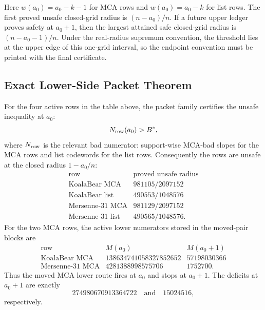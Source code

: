 Here \(w(a_0)=a_0-k-1\) for MCA rows and \(w(a_0)=a_0-k\) for list rows.
The first proved unsafe closed-grid radius is \((n-a_0)/n\).  If a future
upper ledger proves safety at \(a_0+1\), then the largest attained safe
closed-grid radius is \((n-a_0-1)/n\).  Under the real-radius supremum
convention, the threshold lies at the upper edge of this one-grid interval,
so the endpoint convention must be printed with the final certificate.

\subsection{Exact Lower-Side Packet Theorem}

\begin{proposition}
\label{prop:finite-packet-unsafe}
For the four active rows in the table above, the packet family certifies the
unsafe inequality at \(a_0\):
\[
        N_{\rm row}(a_0)>B^*,
\]
where \(N_{\rm row}\) is the relevant bad numerator: support-wise MCA-bad
slopes for the MCA rows and list codewords for the list rows.  Consequently
the rows are unsafe at the closed radius \(1-a_0/n\):
\[
\begin{array}{c|c}
\text{row} & \text{proved unsafe radius}\\ \hline
\text{KoalaBear MCA} & 981105/2097152\\
\text{KoalaBear list} & 490553/1048576\\
\text{Mersenne-31 MCA} & 981129/2097152\\
\text{Mersenne-31 list} & 490565/1048576.
\end{array}
\]
For the two MCA rows, the active lower numerators stored in the moved-pair
blocks are
\[
\begin{array}{c|cc}
\text{row} & M(a_0) & M(a_0+1)\\ \hline
\text{KoalaBear MCA} &
138634741058327852652 & 57198030366\\
\text{Mersenne-31 MCA} &
4281388998575706 & 1752700.
\end{array}
\]
Thus the moved MCA lower route fires at \(a_0\) and stops at \(a_0+1\).  The
deficits at \(a_0+1\) are exactly
\[
        274980670913364722
        \quad\text{and}\quad
        15024516,
\]
respectively.
\end{proposition}

